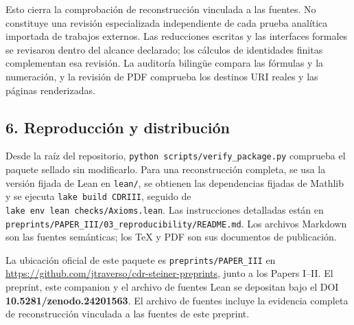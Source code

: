 \documentclass[spanish,11pt,a4paper]{article}
\begin{document}
Esto cierra la comprobación de reconstrucción vinculada a las fuentes. No constituye una revisión especializada independiente de cada prueba analítica importada de trabajos externos. Las reducciones escritas y las interfaces formales se revisaron dentro del alcance declarado; los cálculos de identidades finitas complementan esa revisión. La auditoría bilingüe compara las fórmulas y la numeración, y la revisión de PDF comprueba los destinos URI reales y las páginas renderizadas.

\subsection{6. Reproducción y distribución}\label{reproducciuxf3n-y-distribuciuxf3n}

Desde la raíz del repositorio, \texttt{python\ scripts/\allowbreak{}verify\_\allowbreak{}package.\allowbreak{}py} comprueba el paquete sellado sin modificarlo. Para una reconstrucción completa, se usa la versión fijada de Lean en \texttt{lean/\allowbreak{}}, se obtienen las dependencias fijadas de Mathlib y se ejecuta \texttt{lake\ build\ CDRIII}, seguido de \texttt{lake\ env\ lean\ checks/\allowbreak{}Axioms.\allowbreak{}lean}. Las instrucciones detalladas están en \texttt{preprints/\allowbreak{}PAPER\_\allowbreak{}III/\allowbreak{}03\_\allowbreak{}reproducibility/\allowbreak{}README.\allowbreak{}md}. Los archivos Markdown son las fuentes semánticas; los TeX y PDF son sus documentos de publicación.

La ubicación oficial de este paquete es \texttt{preprints/\allowbreak{}PAPER\_\allowbreak{}III} en \url{https://github.com/jtraverso/cdr-steiner-preprints}, junto a los Papers I--II. El preprint, este companion y el archivo de fuentes Lean se depositan bajo el DOI \textbf{10.5281/zenodo.24201563}. El archivo de fuentes incluye la evidencia completa de reconstrucción vinculada a las fuentes de este preprint.
\end{document}
